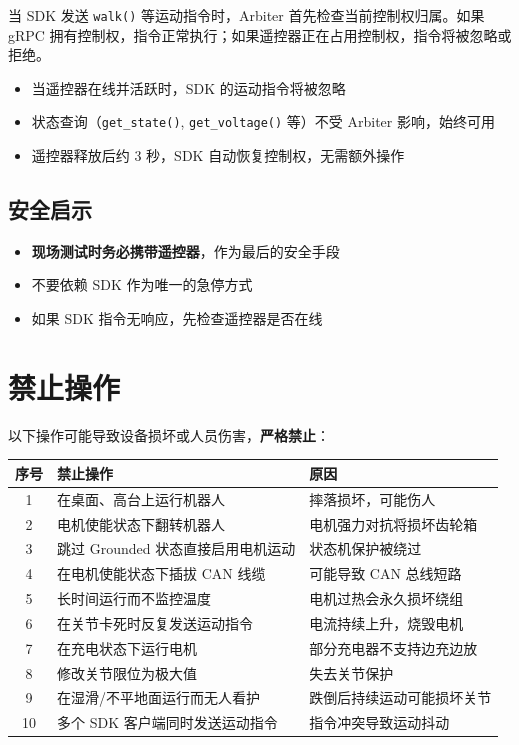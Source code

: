 \documentclass[a4paper,11pt,openany]{book}
\begin{document}
当 SDK 发送 \texttt{walk()} 等运动指令时，Arbiter 首先检查当前控制权归属。如果 gRPC 拥有控制权，指令正常执行；如果遥控器正在占用控制权，指令将被忽略或拒绝。

\begin{itemize}[nosep]
  \item 当遥控器在线并活跃时，SDK 的运动指令将被忽略
  \item 状态查询（\texttt{get\_state()}, \texttt{get\_voltage()} 等）不受 Arbiter 影响，始终可用
  \item 遥控器释放后约 3 秒，SDK 自动恢复控制权，无需额外操作
\end{itemize}

\subsection{安全启示}

\begin{itemize}[nosep]
  \item \textbf{现场测试时务必携带遥控器}，作为最后的安全手段
  \item 不要依赖 SDK 作为唯一的急停方式
  \item 如果 SDK 指令无响应，先检查遥控器是否在线
\end{itemize}

\section{禁止操作}

以下操作可能导致设备损坏或人员伤害，\textbf{严格禁止}：

{\small
\begin{longtable}{cll}
\toprule
序号 & 禁止操作 & 原因 \\
\midrule
\endhead
1 & 在桌面、高台上运行机器人 & 摔落损坏，可能伤人 \\
2 & 电机使能状态下翻转机器人 & 电机强力对抗将损坏齿轮箱 \\
3 & 跳过 Grounded 状态直接启用电机运动 & 状态机保护被绕过 \\
4 & 在电机使能状态下插拔 CAN 线缆 & 可能导致 CAN 总线短路 \\
5 & 长时间运行而不监控温度 & 电机过热会永久损坏绕组 \\
6 & 在关节卡死时反复发送运动指令 & 电流持续上升，烧毁电机 \\
7 & 在充电状态下运行电机 & 部分充电器不支持边充边放 \\
8 & 修改关节限位为极大值 & 失去关节保护 \\
9 & 在湿滑/不平地面运行而无人看护 & 跌倒后持续运动可能损坏关节 \\
10 & 多个 SDK 客户端同时发送运动指令 & 指令冲突导致运动抖动 \\
\bottomrule
\end{longtable}
}
\end{document}
